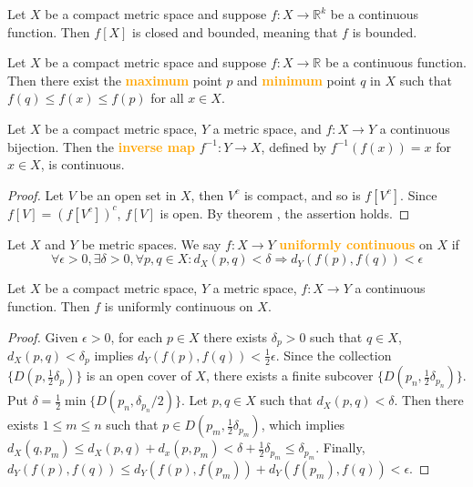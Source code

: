 \begin{theorem}
Let $X$ be a compact metric space and suppose $f:X\to \mathbb{R}^k$ be a continuous function. Then $f[X]$ is closed and bounded, meaning that $f$ is bounded.
\end{theorem}

\begin{theorem}
Let $X$ be a compact metric space and suppose $f:X\to \mathbb{R}$ be a continuous function. Then there exist the \textbf{\textcolor{orange}{maximum}} point $p$ and \textbf{\textcolor{orange}{minimum}} point $q$ in $X$ such that $f(q)\leq f(x)\leq f(p)$ for all $x\in X$.
\end{theorem}

\begin{theorem}
Let $X$ be a compact metric space, $Y$ a metric space, and $f:X\to Y$ a continuous bijection. Then the \textbf{\textcolor{orange}{inverse map}} $f^{-1}:Y\to X$, defined by $f^{-1}(f(x))=x$ for $x\in X$, is continuous.
\end{theorem}
\begin{proof}
Let $V$ be an open set in $X$, then $V^c$ is compact, and so is $f[V^c]$. Since $f[V]=(f[V^c])^c$, $f[V]$ is open. By theorem , the assertion holds.
\end{proof}

\begin{definition}
Let $X$ and $Y$ be metric spaces. We say $f:X\to Y$ \textbf{\textcolor{orange}{uniformly continuous}} on $X$ if
$$\forall \epsilon>0,\exists \delta>0,\forall p,q\in X:d_X(p,q)<\delta \Rightarrow d_Y(f(p),f(q))<\epsilon$$
\end{definition}

\begin{theorem}
Let $X$ be a compact metric space, $Y$ a metric space, $f:X\to Y$ a continuous function. Then $f$ is uniformly continuous on $X$.
\end{theorem}
\begin{proof}
Given $\epsilon>0$, for each $p\in X$ there exists $\delta_p>0$ such that $q\in X$, $d_X(p,q)<\delta_p$ implies $d_Y(f(p),f(q))<\frac{1}{2}\epsilon$. Since the collection $\{D(p,\frac{1}{2}\delta_p)\}$ is an open cover of $X$, there exists a finite subcover $\{D(p_n,\frac{1}{2}\delta_{p_n})\}$. Put $\delta = \frac{1}{2}\min \{D(p_n,\delta_{p_n}/2)\}$. Let $p,q\in X$ such that $d_X(p,q)<\delta$. Then there exists $1\leq m\leq n$ such that $p\in D(p_m,\frac{1}{2}\delta_{p_m})$, which implies $d_X(q,p_m)\leq d_X(p,q)+d_x(p,p_m)<\delta+\frac{1}{2}\delta_{p_m}\leq \delta_{p_m}$. Finally, $d_Y(f(p),f(q))\leq d_Y(f(p),f(p_m))+d_Y(f(p_m),f(q))<\epsilon$.
\end{proof}

